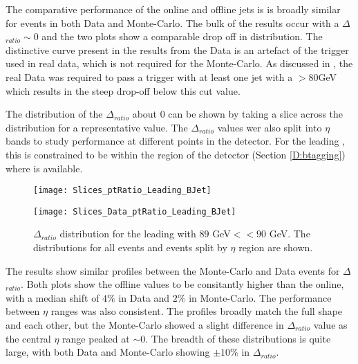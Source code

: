 		The comparative performance of the online and offline jets is \pt is broadly similar for events in both Data and Monte-Carlo. The bulk of the results occur with a $\Delta$\pt$_{ratio}\sim0$ and the two plots show a comparable drop off in \pt distribution. The distinctive curve present in the results from the Data is an artefact of the trigger used in real data, which is not required for the Monte-Carlo. As discussed in , the real Data was required to pass a trigger with at least one jet with a \pt$>80$GeV which results in the steep drop-off below this cut value. 
		
		The distribution of the $\Delta$\pt$_{ratio}$ about 0 can be shown by taking a slice across the distribution for a representative \pt value. The $\Delta $\pt$_{ratio}$ values wer also split into $\eta$ bands to study performance at different points in the detector. For the leading \bjet, this is constrained to be within the region of the detector (Section \ref{D:btagging}) where \btagging is available.   
		
		\begin{figure}[h]
			\centering

			\begin{minipage}[h]{0.33\linewidth}
				\texttt{[image: Slices\_ptRatio\_Leading\_BJet]}
			\end{minipage}
			\quad
			\begin{minipage}[h]{0.33\linewidth}
				\texttt{[image: Slices\_Data\_ptRatio\_Leading\_BJet]}
			\end{minipage}
			\caption{$\Delta $\pt$_{ratio}$ distribution for the leading \bjet with $89$ GeV$<$\pt$<90$ GeV. The distributions for all events and events split by $\eta$ region are shown.}
			\label{fig:O:leadingbptslice}
		\end{figure}
		
		 The results show similar profiles between the Monte-Carlo and Data events for $\Delta$\pt$_{ratio}$. Both plots show the offline \pt values to be consitantly higher than the online, with a median shift of $4\%$ in Data and $2\%$ in Monte-Carlo. The performance between $\eta$ ranges was also consistent. The profiles broadly match the full shape and each other, but the Monte-Carlo showed a slight difference in  $\Delta$\pt$_{ratio}$ value as the central $\eta$ range peaked at $\sim0$. The breadth of these distributions is quite large, with both Data and Monte-Carlo showing $\pm10\%$ in $\Delta$\pt$_{ratio}$.
		
